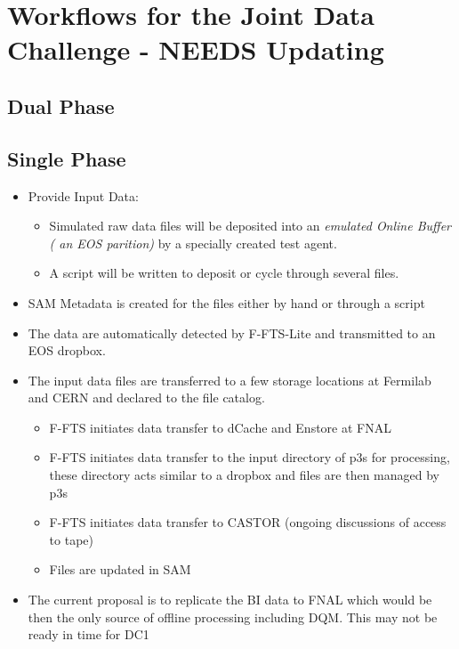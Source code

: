 \documentclass[pdftex,12pt,letter]{article}
\newcommand{\singp}{Single Phase\xspace}
\newcommand{\dualp}{Dual Phase\xspace}
\begin{document}
\section{Workflows for the Joint Data Challenge - NEEDS Updating}

\subsection{\dualp}

\subsection{\singp}

\begin{itemize}

\item Provide Input Data: 
\begin{itemize}
\item Simulated raw data files will be deposited into an \emph{emulated Online Buffer ( an EOS parition)} by a specially created test agent.
\item A script will be written to deposit or cycle through several files. 
\end{itemize}
\item SAM Metadata is created for the files either by hand or through a script

\item The data  are automatically detected by F-FTS-Lite and transmitted to an EOS dropbox.

\item The input data files are transferred to a few storage locations at Fermilab and CERN and
declared to the file catalog.
\begin{itemize}
\item F-FTS initiates data transfer to dCache and Enstore at FNAL
\item F-FTS initiates data transfer to the input directory of p3s for processing, these directory acts similar to a dropbox and files are then managed by p3s
\item F-FTS initiates data transfer to CASTOR (ongoing discussions of access to tape)
\item Files are updated in SAM
\end{itemize}

\item 

The current proposal is to replicate the BI data to FNAL which would be then the only
source of offline processing including DQM. This may not be ready in time for DC1


\end{itemize}
\end{document}

